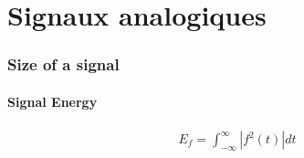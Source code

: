 \documentclass[a4paper]{amsart}
\title{}
\author{Johan Boissard}
\date\today
\begin{document}
	
	

\part{Signaux analogiques}
\section{Size of a signal}

\subsection{Signal Energy}
\begin{eqnarray}
	E_f=\int_{-\infty}^{\infty}|f^2(t)|dt
\end{eqnarray}
\end{document}
